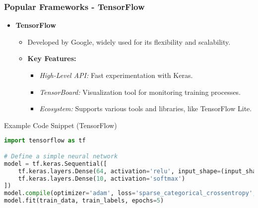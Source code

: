 \documentclass[aspectratio=169]{beamer}
\begin{document}
\begin{frame}
    \frametitle{Popular Frameworks - TensorFlow}
    \begin{itemize}
        \item \textbf{TensorFlow}
        \begin{itemize}
            \item Developed by Google, widely used for its flexibility and scalability.
            \item \textbf{Key Features:}
            \begin{itemize}
                \item \textit{High-Level API:} Fast experimentation with Keras.
                \item \textit{TensorBoard:} Visualization tool for monitoring training processes.
                \item \textit{Ecosystem:} Supports various tools and libraries, like TensorFlow Lite.
            \end{itemize}
        \end{itemize}
    \end{itemize}
    
    \begin{block}{Example Code Snippet (TensorFlow)}
    \begin{lstlisting}[language=Python]
import tensorflow as tf

# Define a simple neural network
model = tf.keras.Sequential([
    tf.keras.layers.Dense(64, activation='relu', input_shape=(input_shape,)),
    tf.keras.layers.Dense(10, activation='softmax')
])
model.compile(optimizer='adam', loss='sparse_categorical_crossentropy', metrics=['accuracy'])
model.fit(train_data, train_labels, epochs=5)
    \end{lstlisting}
    \end{block}
\end{frame}
\end{document}
